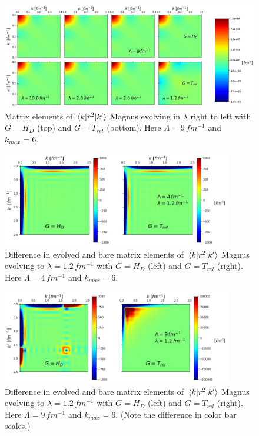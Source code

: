 \documentclass[preprintnumbers,floatfix,aps,prc,preprint,nofootinbib]{revtex4-1}
\begin{document}
\begin{figure}[H]
  	\captionsetup{singlelinecheck=false,justification=raggedright}
  	\centering
  	\includegraphics[width=14cm]{r2_operator_contours_magnus_Wendt_Lamb9}
  	\hspace*{0.05\textwidth}
  	\caption{Matrix elements of $\mel{k}{r^2}{k'}$ Magnus evolving in $\lambda$ right to left with $G=H_D$ (top) and $G=T_{rel}$ (bottom). Here $\Lambda=9 \, fm^{-1}$ and $k_{max}=6$.}
  	\label{fig:r2_operator_contours_srg_Wendt_Lamb9}
\end{figure}
%
\begin{figure}[H]
  	\captionsetup{singlelinecheck=false,justification=raggedright}
  	\centering
  	\includegraphics[width=10cm]{r2_difference_magnus_Wendt_Lamb4}
  	\hspace*{0.05\textwidth}
  	\caption{Difference in evolved and bare matrix elements of $\mel{k}{r^2}{k'}$ Magnus evolving to $\lambda=1.2 \, fm^{-1}$ with $G=H_D$ (left) and $G=T_{rel}$ (right). Here $\Lambda=4 \, fm^{-1}$ and $k_{max}=6$.}
  	\label{fig:r2_difference_magnus_Wendt_Lamb4}
\end{figure}
%
\begin{figure}[H]
  	\captionsetup{singlelinecheck=false,justification=raggedright}
  	\centering
  	\includegraphics[width=10cm]{r2_difference_magnus_Wendt_Lamb9}
  	\hspace*{0.05\textwidth}
  	\caption{Difference in evolved and bare matrix elements of $\mel{k}{r^2}{k'}$ Magnus evolving to $\lambda=1.2 \, fm^{-1}$ with $G=H_D$ (left) and $G=T_{rel}$ (right). Here $\Lambda=9 \, fm^{-1}$ and $k_{max}=6$. (Note the difference in color bar scales.)}
  	\label{fig:r2_difference_magnus_Wendt_Lamb9}
\end{figure}
\end{document}

